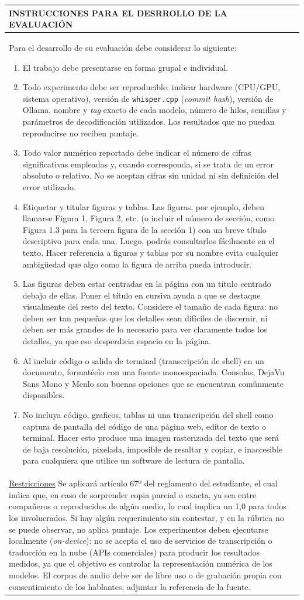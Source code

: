 \documentclass[12pt]{article}
\newcommand{\reglas}{%
	\item El trabajo debe presentarse en forma grupal e individual.
	\item Todo experimento debe ser reproducible: indicar hardware (CPU/GPU, sistema operativo),
	versión de \texttt{whisper.cpp} (\textit{commit hash}), versión de Ollama, nombre y \textit{tag} exacto
	de cada modelo, número de hilos, semillas y parámetros de decodificación utilizados. Los resultados
	que no puedan reproducirse no reciben puntaje.
	\item Todo valor numérico reportado debe indicar el número de cifras significativas empleadas y,
	cuando corresponda, si se trata de un error absoluto o relativo. No se aceptan cifras sin unidad
	ni sin definición del error utilizado.
	\item Etiquetar y titular figuras y tablas. Las figuras, por ejemplo, deben llamarse Figura 1, Figura 2,
	etc. (o incluir el número de sección, como Figura 1.3 para la tercera figura de la sección 1) con
	un breve título descriptivo para cada una. Luego, podrás consultarlos fácilmente en el texto.
	Hacer referencia a figuras y tablas por su nombre evita cualquier ambigüedad que algo como
	la figura de arriba pueda introducir.
	\item Las figuras deben estar centradas en la página con un título centrado debajo de ellas. Poner el
	título en cursiva ayuda a que se destaque visualmente del resto del texto. Considere el tamaño
	de cada figura: no deben ser tan pequeñas que los detalles sean difíciles de discernir, ni deben
	ser más grandes de lo necesario para ver claramente todos los detalles, ya que eso desperdicia
	espacio en la página.
	\item Al incluir código o salida de terminal (transcripción de shell) en un documento, formatéelo con
	una fuente monoespaciada. Consolas, DejaVu Sans Mono y Menlo son buenas opciones que se
	encuentran comúnmente disponibles.
	\item No incluya código, graficos, tablas ni una transcripción del shell como captura de pantalla
	del código de una página web, editor de texto o terminal. Hacer esto produce una imagen
	rasterizada del texto que será de baja resolución, pixelada, imposible de resaltar y copiar, e
	inaccesible para cualquiera que utilice un software de lectura de pantalla.
}
\newcommand{\restricciones}{%
Se aplicará artículo 67º del reglamento del estudiante, el cual indica que, en caso de sorprender copia parcial o exacta, ya sea entre compañeros o reproducidos de algún medio, lo cual implica un 1,0 para todos los involucrados.
Si hay algún requerimiento sin contestar, y en la rúbrica no se puede observar, no aplica puntaje.
Los experimentos deben ejecutarse localmente (\textit{on-device}): no se acepta el uso de servicios de transcripción o traducción en la nube (APIs comerciales) para producir los resultados medidos, ya que el objetivo es controlar la representación numérica de los modelos.
El corpus de audio debe ser de libre uso o de grabación propia con consentimiento de los hablantes; adjuntar la referencia de la fuente.
}
\begin{document}
{  \newpage
  \begin{longtable}{|p{}|@{}c@{}}
    \hline
    \centering\cellcolor{cyan}\textbf{\color{white}INSTRUCCIONES PARA EL DESRROLLO DE LA EVALUACIÓN}&\\\hline
    {\small
      \vspace{7pt}Para el desarrollo de su evaluación debe considerar lo siguiente:%
      \setlist[enumerate]{itemsep=0pt,parsep=0pt,partopsep=0pt,topsep=0pt}
      \begin{enumerate}
        \reglas
      \end{enumerate}
    }&\\
    {\small
      \setlist[enumerate]{}
      \underline{Restricciones}\newline
      \noindent\restricciones
    }&\\\hline
  \end{longtable}
}
\end{document}
